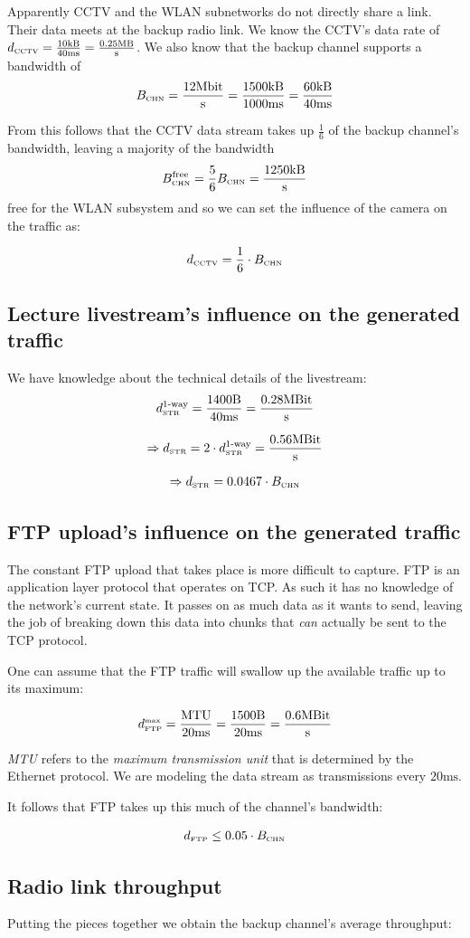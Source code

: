 \documentclass[a4paper]{scrreprt}
\begin{document}
			Apparently CCTV and the WLAN subnetworks do not directly share a link. Their data meets at the backup radio link. We know the CCTV's data rate of  $d_\text{\tiny CCTV}=\frac{10\text{kB}}{40\text{ms}}=\frac{0.25\text{MB}}{\text{s}}$. We also know that the backup channel supports a bandwidth of \[B_\text{\tiny CHN}=\frac{12\text{Mbit}}{\text{s}}=\frac{1500\text{kB}}{1000\text{ms}}=\frac{60\text{kB}}{40\text{ms}}\]
			
			From this follows that the CCTV data stream takes up $\frac{1}{6}$ of the backup channel's bandwidth, leaving a majority of the bandwidth \[B_\text{\tiny CHN}^\text{free}=\frac{5}{6} B_\text{\tiny CHN}=\frac{1250\text{kB}}{\text{s}}\] free for the WLAN subsystem and so we can set the influence of the camera on the traffic as:
			
			\[d_\text{\tiny CCTV}=\frac{1}{6}\cdot B_\text{\tiny CHN}\]
		
			\subsection{Lecture livestream's influence on the generated traffic}
			We have knowledge about the technical details of the livestream: 
		\[d_\text{\tiny STR}^\text{1-way}=\frac{1400\text{B}}{40\text{ms}}=\frac{0.28\text{MBit}}{\text{s}}\]
		
			\[\Rightarrow d_\text{\tiny STR}=2\cdot d_\text{\tiny STR}^\text{1-way}=\frac{0.56\text{MBit}}{\text{s}}\]
			
			\[\Rightarrow d_\text{\tiny STR}=0.0467\cdot B_\text{\tiny CHN}\]
			
			\subsection{FTP upload's influence on the generated traffic}
			The constant FTP upload that takes place is more difficult to capture. FTP is an application layer protocol that operates on TCP. As such it has no knowledge of the network's current state. It passes on as much data as it wants to send, leaving the job of breaking down this data into chunks that \emph{can} actually be sent to the TCP protocol. 
			
			One can assume that the FTP traffic will swallow up the available traffic up to its maximum:
			
			\[d_\text{\tiny FTP}^\text{\tiny max}=\frac{\text{MTU}}{20\text{ms}}=\frac{1500\text{B}}{20\text{ms}}=\frac{0.6\text{MBit}}{\text{s}}\]
			
			\emph{MTU} refers to the \emph{maximum transmission unit} that is determined by the Ethernet protocol. We are modeling the data stream as transmissions every $20\text{ms}$.
			
			It follows that FTP takes up this much of the channel's bandwidth:
			
			\[d_\text{\tiny FTP}\leq 0.05\cdot B_\text{\tiny CHN}\]
			
			\subsection{Radio link throughput}
			Putting the pieces together we obtain the backup channel's average throughput:
			
			
\end{document}
